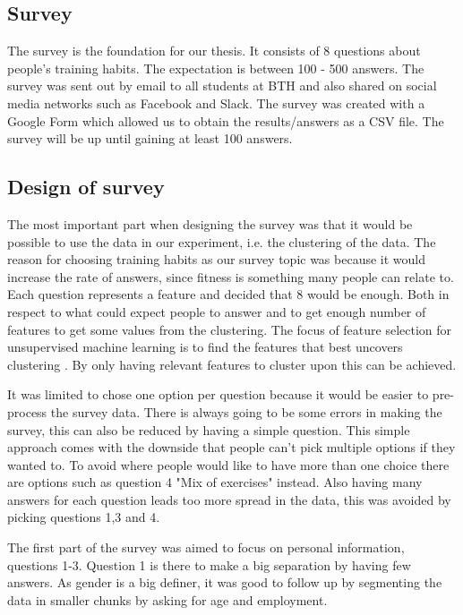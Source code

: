 \documentclass[a4paper]{article}
\begin{document}
\subsection{Survey}
The survey is the foundation for our thesis. It consists of 8 questions about people's training habits. The expectation is between 100 - 500 answers. The survey was sent out by email to all students at BTH and also shared on social media networks such as Facebook and Slack. The survey was created with a Google Form which allowed us to obtain the results/answers as a CSV file. The survey will be up until gaining at least 100 answers.


\subsection{Design of survey}

The most important part when designing the survey was that it would be possible to use the data in our experiment, i.e. the clustering of the data. The reason for choosing training habits as our survey topic was because it would increase the rate of answers, since fitness is something many people can relate to. Each question represents a feature and decided that 8 would be enough. Both in respect to what could expect people to answer and to get enough number of features to get some values from the clustering. The focus of feature selection for unsupervised machine learning is to find the features that best uncovers clustering \cite{featureSelectionUnsupervised}. By only having relevant features to cluster upon this can be achieved.

It was limited to chose one option per question because it would be easier to pre-process the survey data. There is always going to be some errors in making the survey\cite{survey}, this can also be reduced by having a simple question. This simple approach comes with the downside that people can't pick multiple options if they wanted to. To avoid where people would like to have more than one choice there are options such as question 4 "Mix of exercises" instead. Also having many answers for each question leads too more spread in the data, this was avoided by picking questions 1,3 and 4.
% 
% 
% 

The first part of the survey was aimed to focus on personal information, questions 1-3. Question 1 is there to make a big separation by having few answers. As gender is a big definer, it was good to follow up by segmenting the data in smaller chunks by asking for age and employment.
\end{document}
